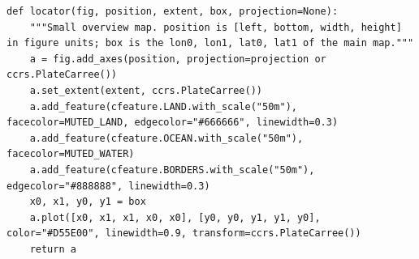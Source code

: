 \begin{lstlisting}[firstnumber=115]
def locator(fig, position, extent, box, projection=None):
    """Small overview map. position is [left, bottom, width, height] in figure units; box is the lon0, lon1, lat0, lat1 of the main map."""
    a = fig.add_axes(position, projection=projection or ccrs.PlateCarree())
    a.set_extent(extent, ccrs.PlateCarree())
    a.add_feature(cfeature.LAND.with_scale("50m"), facecolor=MUTED_LAND, edgecolor="#666666", linewidth=0.3)
    a.add_feature(cfeature.OCEAN.with_scale("50m"), facecolor=MUTED_WATER)
    a.add_feature(cfeature.BORDERS.with_scale("50m"), edgecolor="#888888", linewidth=0.3)
    x0, x1, y0, y1 = box
    a.plot([x0, x1, x1, x0, x0], [y0, y0, y1, y1, y0], color="#D55E00", linewidth=0.9, transform=ccrs.PlateCarree())
    return a
\end{lstlisting}
